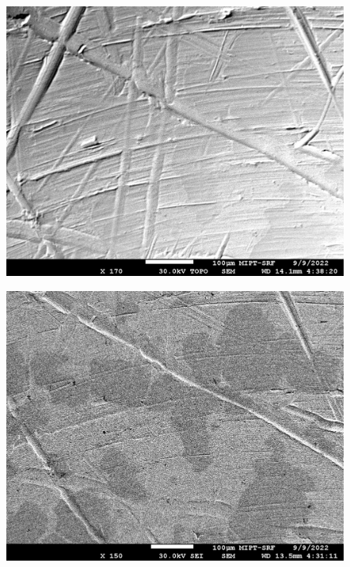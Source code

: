 \documentclass[a4paper,12pt]{article}
\begin{document}
\newpage

\begin{figure}[h]
\centering
\begin{minipage}{.5\textwidth}
  \centering
  \includegraphics[width=1.2\linewidth]{Tablet005.jpg}
  \label{fig:topograph}
\end{minipage}%
\begin{minipage}{.5\textwidth}
  \centering
  \includegraphics[width=1.2\linewidth]{Tablet001.jpg}
  \label{fig:komp}
\end{minipage}
\end{figure}
\end{document}
